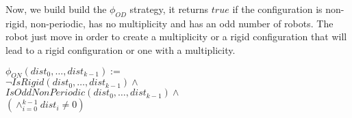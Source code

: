 \documentclass{article}
\begin{document}
Now, we build build the $\phi_{OD}$ strategy, it returns $true$ if the configuration is non-rigid, non-periodic, has no multiplicity and has an odd number of robots. The robot just move in order to create a multiplicity or a rigid configuration that will lead to a rigid configuration or one with a multiplicity.

\begin{center}
    
$\phi_{ON}(dist_{0}, \ldots , dist_{k-1}):=$\\
$\lnot IsRigid(dist_{0}, \ldots ,dist_{k-1}) \land $\\
$IsOddNonPeriodic(dist_{0}, \ldots , dist_{k-1}) \land $\\
$(\land_{i=0}^{k-1} dist_{i} \not= 0)$
\end{center}



\printbibliography %
\end{document}
